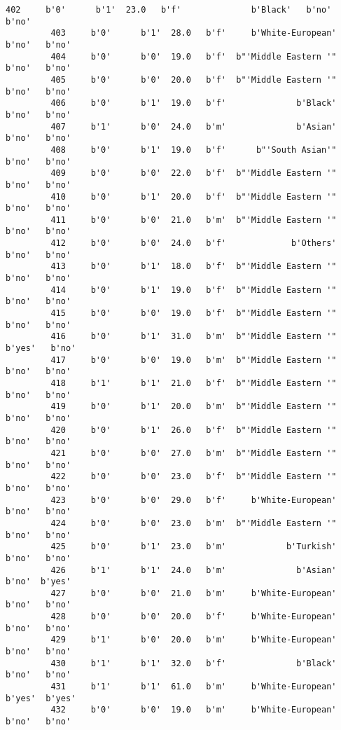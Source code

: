 \documentclass[11pt]{article}
\begin{document}
\begin{Verbatim}[commandchars=\\\{\}]
         402     b'0'      b'1'  23.0   b'f'              b'Black'   b'no'   b'no'   
         403     b'0'      b'1'  28.0   b'f'     b'White-European'   b'no'   b'no'   
         404     b'0'      b'0'  19.0   b'f'  b"'Middle Eastern '"   b'no'   b'no'   
         405     b'0'      b'0'  20.0   b'f'  b"'Middle Eastern '"   b'no'   b'no'   
         406     b'0'      b'1'  19.0   b'f'              b'Black'   b'no'   b'no'   
         407     b'1'      b'0'  24.0   b'm'              b'Asian'   b'no'   b'no'   
         408     b'0'      b'1'  19.0   b'f'      b"'South Asian'"   b'no'   b'no'   
         409     b'0'      b'0'  22.0   b'f'  b"'Middle Eastern '"   b'no'   b'no'   
         410     b'0'      b'1'  20.0   b'f'  b"'Middle Eastern '"   b'no'   b'no'   
         411     b'0'      b'0'  21.0   b'm'  b"'Middle Eastern '"   b'no'   b'no'   
         412     b'0'      b'0'  24.0   b'f'             b'Others'   b'no'   b'no'   
         413     b'0'      b'1'  18.0   b'f'  b"'Middle Eastern '"   b'no'   b'no'   
         414     b'0'      b'1'  19.0   b'f'  b"'Middle Eastern '"   b'no'   b'no'   
         415     b'0'      b'0'  19.0   b'f'  b"'Middle Eastern '"   b'no'   b'no'   
         416     b'0'      b'1'  31.0   b'm'  b"'Middle Eastern '"  b'yes'   b'no'   
         417     b'0'      b'0'  19.0   b'm'  b"'Middle Eastern '"   b'no'   b'no'   
         418     b'1'      b'1'  21.0   b'f'  b"'Middle Eastern '"   b'no'   b'no'   
         419     b'0'      b'1'  20.0   b'm'  b"'Middle Eastern '"   b'no'   b'no'   
         420     b'0'      b'1'  26.0   b'f'  b"'Middle Eastern '"   b'no'   b'no'   
         421     b'0'      b'0'  27.0   b'm'  b"'Middle Eastern '"   b'no'   b'no'   
         422     b'0'      b'0'  23.0   b'f'  b"'Middle Eastern '"   b'no'   b'no'   
         423     b'0'      b'0'  29.0   b'f'     b'White-European'   b'no'   b'no'   
         424     b'0'      b'0'  23.0   b'm'  b"'Middle Eastern '"   b'no'   b'no'   
         425     b'0'      b'1'  23.0   b'm'            b'Turkish'   b'no'   b'no'   
         426     b'1'      b'1'  24.0   b'm'              b'Asian'   b'no'  b'yes'   
         427     b'0'      b'0'  21.0   b'm'     b'White-European'   b'no'   b'no'   
         428     b'0'      b'0'  20.0   b'f'     b'White-European'   b'no'   b'no'   
         429     b'1'      b'0'  20.0   b'm'     b'White-European'   b'no'   b'no'   
         430     b'1'      b'1'  32.0   b'f'              b'Black'   b'no'   b'no'   
         431     b'1'      b'1'  61.0   b'm'     b'White-European'  b'yes'  b'yes'   
         432     b'0'      b'0'  19.0   b'm'     b'White-European'   b'no'   b'no'   

\end{Verbatim}
\end{document}
